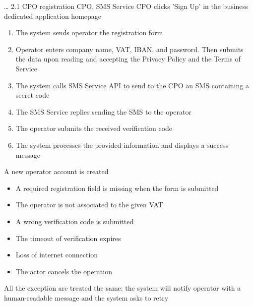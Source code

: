 \usecase
{
    \dots %
}
{2.1}
{CPO registration} %
{CPO, SMS Service} %
{CPO clicks 'Sign Up' in the business dedicated application homepage} %
{ %
    \begin{enumerate}
        \item The system sends operator the registration form
        \item Operator enters company name, VAT, IBAN, and password. Then submits the data upon reading and accepting the Privacy Policy and the Terms of Service
        \item The system calls SMS Service API to send to the CPO an SMS containing a secret code
        \item The SMS Service replies sending the SMS to the operator
        \item The operator submits the received verification code
        \item The system processes the provided information and displays a success message
    \end{enumerate}
}
{A new operator account is created} %
{ %
    \begin{itemize}
        \item A required registration field is missing when the form is submitted
        \item The operator is not associated to the given VAT
        \item A wrong verification code is submitted
        \item The timeout of verification expires
        \item Loss of internet connection
        \item The actor cancels the operation
    \end{itemize}
}
{ %
    All the exception are treated the same: the system will notify operator with a human-readable message and the system asks to retry
}

